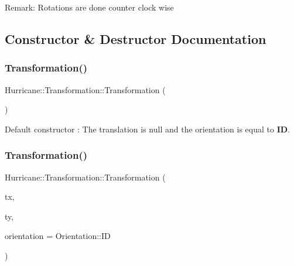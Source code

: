 \begin{DoxyParagraph}{Remark\+: Rotations are done counter clock wise}

\end{DoxyParagraph}


\subsection{Constructor \& Destructor Documentation}
\mbox{\label{classHurricane_1_1Transformation_a7a28cd6c2f62898bc947dc3f41fe3bcf}} 
\subsubsection{\texorpdfstring{Transformation()}{Transformation()}\hspace{0.1cm}{\footnotesize\ttfamily [1/4]}}
{\footnotesize\ttfamily Hurricane\+::\+Transformation\+::\+Transformation (\begin{DoxyParamCaption}{ }\end{DoxyParamCaption})}

Default constructor \+: The translation is null and the orientation is equal to {\bfseries ID}. \mbox{\label{classHurricane_1_1Transformation_a6bb0e856cd0374bd6f38ee835a4744c0}} 
\subsubsection{\texorpdfstring{Transformation()}{Transformation()}\hspace{0.1cm}{\footnotesize\ttfamily [2/4]}}
{\footnotesize\ttfamily Hurricane\+::\+Transformation\+::\+Transformation (\begin{DoxyParamCaption}\item[{const \mbox{\hyperlink{group__DbUGroup_ga4fbfa3e8c89347af76c9628ea06c4146}{Db\+U\+::\+Unit}} \&}]{tx,  }\item[{const \mbox{\hyperlink{group__DbUGroup_ga4fbfa3e8c89347af76c9628ea06c4146}{Db\+U\+::\+Unit}} \&}]{ty,  }\item[{const \mbox{\hyperlink{classHurricane_1_1Transformation_1_1Orientation}{Orientation}} \&}]{orientation = {\ttfamily Orientation\+:\+:ID} }\end{DoxyParamCaption})}

